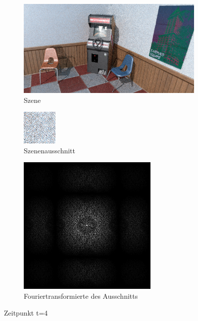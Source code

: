 \begin{figure}[H]
    \begin{subfigure}{\textwidth}  
        \centering \includegraphics[scale=.25]{content/TemporalerAlg/Bilder/Sorting/Screenshots/seed_debug_6.0_selection.png}
        \caption{Szene}
        \label{fig:Nur_Sorting_Szene_t4}
    \end{subfigure}
    \begin{subfigure}{0.5\textwidth}
        \centering\includegraphics[width=0.4\linewidth]{content/TemporalerAlg/Bilder/Sorting/Screenshots/seed_debug_6.0_ausschnitt.png} 
        \caption{Szenenausschnitt}
        \label{fig:Nur_Sorting_ausschnitt_t4}
    \end{subfigure}
    \begin{subfigure}{0.5\textwidth}
        \centering\includegraphics[width=0.4\linewidth]{content/TemporalerAlg/Bilder/Sorting/Screenshots/Spektren/seed_debug_6.0_ausschnitt.png}
        \caption{Fouriertransformierte des Ausschnitts}
        \label{fig:Nur_Sorting_Fouriertransformierte_t4}
    \end{subfigure}
        \caption{Zeitpunkt t=4}
        \label{fig:Nur_Sorting_Verlauf_t4}
\end{figure}

